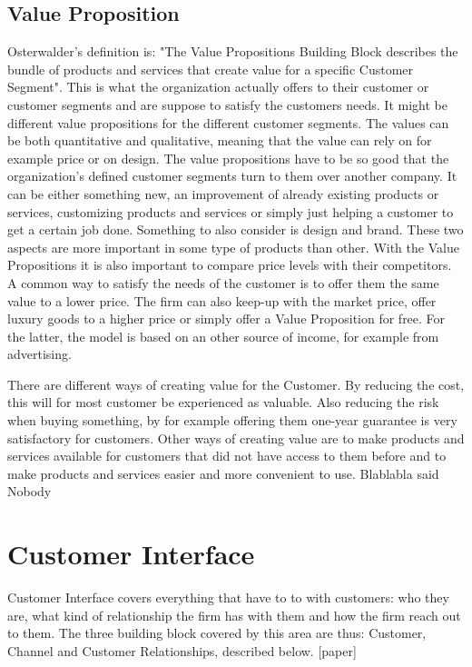\subsection{Value Proposition}
Osterwalder's definition is: "The Value Propositions Building Block describes the bundle of products and services that create value for a specific Customer Segment". This is what the organization actually offers to their customer or customer segments and are suppose to satisfy the customers needs. It might be different value propositions for the different customer segments. The values can be both quantitative and qualitative, meaning that the value can rely on for example price or on design. The value propositions have to be so good that the organization's defined customer segments turn to them over another company. It can be either something new, an improvement of already existing products or services, customizing products and services or simply just helping a customer to get a certain job done. Something to also consider is design and brand. These two aspects are more important in some type of products than other. With the Value Propositions it is also important to compare price levels with their competitors. A common way to satisfy the needs of the customer is to offer them the same value to a lower price. The firm can also keep-up with the market price, offer luxury goods to a higher price or simply offer a Value Proposition for free. For the latter, the model is based on an other source of income, for example from advertising. 

There are different ways of creating value for the Customer. By reducing the cost, this will for most customer be experienced as valuable. Also reducing the risk when buying something, by for example offering them one-year guarantee is very satisfactory for customers. Other ways of creating value are to make products and services available for customers that did not have access to them before and to make products and services easier and more convenient to use.
Blablabla said Nobody \cite{Nobody06}

\section{Customer Interface}
Customer Interface covers everything that have to to with customers: who they are, what kind of relationship the firm has with them and how the firm reach out to them. The three building block covered by this area are thus: Customer, Channel and Customer Relationships, described below. [paper]

